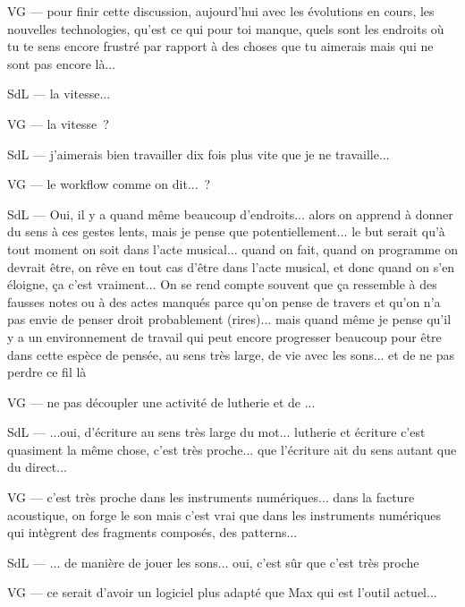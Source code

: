 VG — pour finir cette discussion, aujourd'hui avec les évolutions en cours, les nouvelles technologies, qu'est ce qui pour toi manque, quels sont les endroits où tu te sens encore frustré par rapport à des choses que tu aimerais mais qui ne sont pas encore là...  

SdL — la vitesse... 

VG — la vitesse ? 

SdL — j'aimerais bien travailler dix fois plus vite que je ne travaille... 

VG — le workflow comme on dit... ? 

SdL — Oui, il y a quand même beaucoup d'endroits... alors on apprend à donner du sens à ces gestes lents, mais je pense que potentiellement... le but serait qu'à tout moment on soit dans l'acte musical... quand on fait, quand on programme on devrait être, on rêve en tout cas d'être dans l'acte musical, et donc quand on s'en éloigne, ça c'est vraiment... On se rend compte souvent que ça ressemble à des fausses notes ou à des actes manqués parce qu'on pense de travers et qu'on n'a pas envie de penser droit probablement (rires)... mais quand même je pense qu'il y a un environnement de travail qui peut encore progresser beaucoup pour être dans cette espèce de pensée, au sens très large, de vie avec les sons... et de ne pas perdre ce fil là 

VG — ne pas découpler une activité de lutherie et de ... 

SdL — ...oui, d'écriture au sens très large du mot... lutherie et écriture c'est quasiment la même chose, c'est très proche... que l'écriture ait du sens autant que du direct... 

VG — c'est très proche dans les instruments numériques... dans la facture acoustique, on forge le son mais c'est vrai que dans les instruments numériques qui intègrent des fragments composés, des patterns... 

SdL — ... de manière de jouer les sons... oui, c'est sûr que c'est très proche 

VG — ce serait d'avoir un logiciel plus adapté que Max qui est l'outil actuel... 


